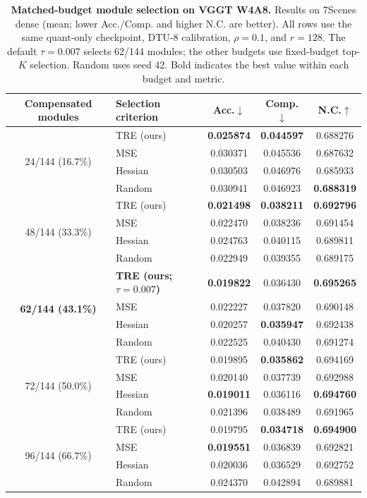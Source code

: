 \documentclass[journal]{Tail_Aware_Post_Training_Quantization_for_3D_Geometry_Models_TMM/IEEEtran}
\begin{document}
\begin{table}[t]
\caption{\textbf{Matched-budget module selection on VGGT W4A8.} Results on 7Scenes dense (mean; lower Acc./Comp. and higher N.C. are better). All rows use the same quant-only checkpoint, DTU-8 calibration, $\rho=0.1$, and $r=128$. The default $\tau=0.007$ selects 62/144 modules; the other budgets use fixed-budget top-$K$ selection. Random uses seed 42. Bold indicates the best value within each budget and metric.}
\label{tab:gate_ablation}
\centering
\scriptsize
\setlength{\tabcolsep}{5.5pt}
\renewcommand{\arraystretch}{1.06}
\begin{tabular}{c l c c c}
\toprule
Compensated modules & Selection criterion & Acc.$\downarrow$ & Comp.$\downarrow$ & N.C.$\uparrow$ \\
\midrule
\multirow{4}{*}{24/144 (16.7\%)}
& TRE (ours) & \textbf{0.025874} & \textbf{0.044597} & 0.688276 \\
& MSE        & 0.030371 & 0.045536 & 0.687632 \\
& Hessian    & 0.030503 & 0.046976 & 0.685933 \\
& Random     & 0.030941 & 0.046923 & \textbf{0.688319} \\
\midrule
\multirow{4}{*}{48/144 (33.3\%)}
& TRE (ours) & \textbf{0.021498} & \textbf{0.038211} & \textbf{0.692796} \\
& MSE        & 0.022470 & 0.038236 & 0.691454 \\
& Hessian    & 0.024763 & 0.040115 & 0.689811 \\
& Random     & 0.022949 & 0.039355 & 0.689175 \\
\midrule
\multirow{4}{*}{\textbf{62/144 (43.1\%)}} 
& \textbf{TRE (ours; $\tau=0.007$)} & \textbf{0.019822} & 0.036430 & \textbf{0.695265} \\
& MSE        & 0.022227 & 0.037820 & 0.690148 \\
& Hessian    & 0.020257 & \textbf{0.035947} & 0.692438 \\
& Random     & 0.022525 & 0.040430 & 0.691274 \\
\midrule
\multirow{4}{*}{72/144 (50.0\%)}
& TRE (ours) & 0.019895 & \textbf{0.035862} & 0.694169 \\
& MSE        & 0.020140 & 0.037739 & 0.692988 \\
& Hessian    & \textbf{0.019011} & 0.036116 & \textbf{0.694760} \\
& Random     & 0.021396 & 0.038489 & 0.691965 \\
\midrule
\multirow{4}{*}{96/144 (66.7\%)}
& TRE (ours) & 0.019795 & \textbf{0.034718} & \textbf{0.694900} \\
& MSE        & \textbf{0.019551} & 0.036839 & 0.692821 \\
& Hessian    & 0.020036 & 0.036529 & 0.692752 \\
& Random     & 0.024370 & 0.042894 & 0.689881 \\
\bottomrule
\end{tabular}
\end{table}
\end{document}
